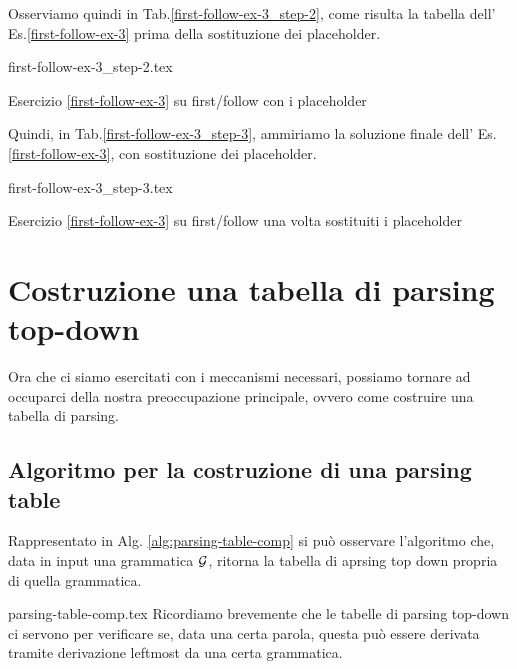 \documentclass[class=book, crop=false, oneside, 12pt]{standalone}
\begin{document}
Osserviamo quindi in Tab.\ref{first-follow-ex-3_step-2}, come risulta la tabella dell' Es.\ref{first-follow-ex-3} prima della sostituzione dei placeholder.
\begin{table}[H]
	\centering
	{first-follow-ex-3_step-2.tex}
    \caption{Esercizio \ref{first-follow-ex-3} su first/follow con i placeholder}
    \label{first-follow-ex-3_step-2}
\end{table}
Quindi, in Tab.\ref{first-follow-ex-3_step-3}, ammiriamo la soluzione finale dell' Es.\ref{first-follow-ex-3}, con sostituzione dei placeholder.
\begin{table}[H]
	\centering
	{first-follow-ex-3_step-3.tex}
    \caption{Esercizio \ref{first-follow-ex-3} su first/follow una volta sostituiti i placeholder}
    \label{first-follow-ex-3_step-3}
\end{table}

\section{Costruzione una tabella di parsing top-down}
Ora che ci siamo esercitati con i meccanismi necessari, possiamo tornare ad occuparci della nostra preoccupazione principale, ovvero come costruire una tabella di parsing.

\subsection{Algoritmo per la costruzione di una parsing table}
Rappresentato in Alg. \ref{alg:parsing-table-comp} si può osservare l'algoritmo che, data in input una grammatica \(\mathcal{G}\), ritorna la tabella di aprsing top down propria di quella grammatica. 

{parsing-table-comp.tex}
Ricordiamo brevemente che le tabelle di parsing top-down ci servono per verificare se, data una certa parola, questa può essere derivata tramite derivazione leftmost da una certa grammatica.
\end{document}
